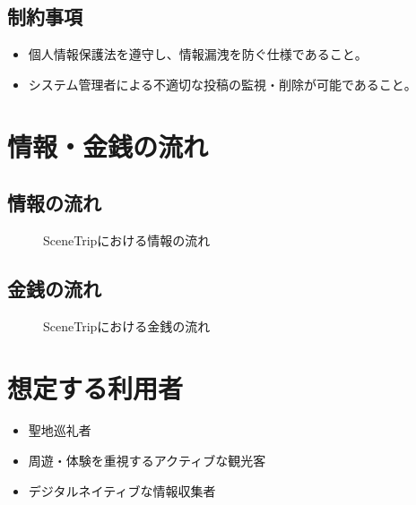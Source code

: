 \documentclass{docs}
\begin{document}
\subsection{制約事項}
\begin{itemize}
	\item 個人情報保護法を遵守し、情報漏洩を防ぐ仕様であること。
	\item システム管理者による不適切な投稿の監視・削除が可能であること。
\end{itemize}

\section{情報・金銭の流れ}
\subsection{情報の流れ}
\begin{figure}[H]
	\centering
	\caption{SceneTripにおける情報の流れ}
	\label{fig:info}
\end{figure}

\subsection{金銭の流れ}
\begin{figure}[H]
	\centering
	\caption{SceneTripにおける金銭の流れ}
	\label{fig:money}
\end{figure}


\section{想定する利用者}
\begin{itemize}
	\item 聖地巡礼者
	\item 周遊・体験を重視するアクティブな観光客
	\item デジタルネイティブな情報収集者
\end{itemize}
\end{document}
